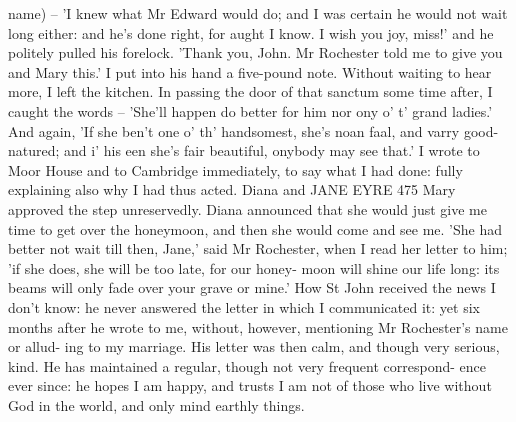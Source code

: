 \documentclass[11pt,twoside]{article}\makeatletter
\begin{document}
\begin{shaded}
name) -- 'I knew what Mr Edward would do; and I was certain he\newline
would not wait long either: and he's done right, for aught I know. I\newline
wish you joy, miss!' and he politely pulled his forelock.\newline
   'Thank you, John. Mr Rochester told me to give you and Mary\newline
this.'\newline
   I put into his hand a five-pound note.  Without waiting to hear\newline
more, I left the kitchen. In passing the door of that sanctum some time\newline
after, I caught the words --\newline
   'She'll happen do better for him nor ony o' t' grand ladies.' And\newline
again, 'If she ben't one o' th' handsomest, she's noan faa⃥l, and varry\newline
good-natured; and i' his een she's fair beautiful, onybody may see\newline
that.'\newline
   I wrote to Moor House and to Cambridge immediately, to say what\newline
I had done: fully explaining also why I had thus acted. Diana and\newline
{}\newline
\newline
                 JANE EYRE                      475\newline
\newline
Mary approved the step unreservedly. Diana announced that she\newline
would just give me time to get over the honeymoon, and then she\newline
would come and see me.\newline
   'She had better not wait till then, Jane,' said Mr Rochester, when I\newline
read her letter to him; 'if she does, she will be too late, for our honey-\newline
moon will shine our life long: its beams will only fade over your\newline
grave or mine.'\newline
   How St John received the news I don't know: he never answered\newline
the letter in which I communicated it: yet six months after he wrote\newline
to me, without, however, mentioning Mr Rochester's name or allud-\newline
ing to my marriage. His letter was then calm, and though very serious,\newline
kind. He has maintained a regular, though not very frequent correspond-\newline
ence ever since: he hopes I am happy, and trusts I am not of those who\newline
live without God in the world, and only mind earthly\newline
things.\end{shaded}
\end{document}
